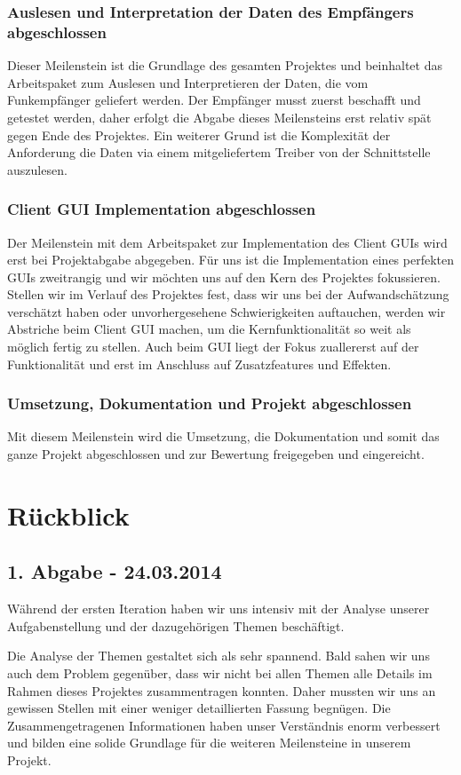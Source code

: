 \subsubsection{Auslesen und Interpretation der Daten des Empfängers abgeschlossen}
Dieser Meilenstein ist die Grundlage des gesamten Projektes und beinhaltet das Arbeitspaket zum Auslesen und Interpretieren der Daten, die vom Funkempfänger geliefert werden. Der Empfänger musst zuerst beschafft und getestet werden, daher erfolgt die Abgabe dieses Meilensteins erst relativ spät gegen Ende des Projektes. Ein weiterer Grund ist die Komplexität der Anforderung die Daten via einem mitgeliefertem Treiber von der Schnittstelle auszulesen.

\subsubsection{Client GUI Implementation abgeschlossen}
Der Meilenstein mit dem Arbeitspaket zur Implementation des Client GUIs wird erst bei Projektabgabe abgegeben. Für uns ist die Implementation eines perfekten GUIs zweitrangig und wir möchten uns auf den Kern des Projektes fokussieren. Stellen wir im Verlauf des Projektes fest, dass wir uns bei der Aufwandschätzung verschätzt haben oder unvorhergesehene Schwierigkeiten auftauchen, werden wir Abstriche beim Client GUI machen, um die Kernfunktionalität so weit als möglich fertig zu stellen. Auch beim GUI liegt der Fokus zuallererst auf der Funktionalität und erst im Anschluss auf Zusatzfeatures und Effekten.

\subsubsection{Umsetzung, Dokumentation und Projekt abgeschlossen}
Mit diesem Meilenstein wird die Umsetzung, die Dokumentation und somit das ganze Projekt abgeschlossen und zur Bewertung freigegeben und eingereicht.

\section{Rückblick}
\subsection{1. Abgabe - 24.03.2014}
Während der ersten Iteration haben wir uns intensiv mit der Analyse unserer Aufgabenstellung und der dazugehörigen Themen beschäftigt.

Die Analyse der Themen gestaltet sich als sehr spannend. Bald sahen wir uns auch dem Problem gegenüber, dass wir nicht bei allen Themen alle Details im Rahmen dieses Projektes zusammentragen konnten. Daher mussten wir uns an gewissen Stellen mit einer weniger detaillierten Fassung begnügen. Die Zusammengetragenen Informationen haben unser Verständnis enorm verbessert und bilden eine solide Grundlage für die weiteren Meilensteine in unserem Projekt.

